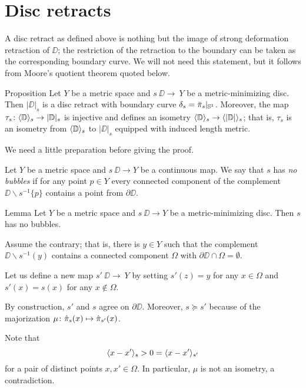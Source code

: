 \section{Disc retracts}\label{Metric-minimizing discs}

A disc retract as defined above is nothing but the image of strong deformation retraction of $\DD$;
the restriction of the retraction to the boundary can be taken as the corresponding boundary curve.
We will not need this statement, but it follows from Moore's quotient theorem quoted below. 

\begin{thm}{Proposition}\label{prop:|D|}
Let $Y$ be a metric space and $s\:\DD\to\ Y$ be a metric-minimizing disc.
Then $|\DD|_s$ is a disc retract with boundary curve $\delta_s=\bar\pi_s|_{\mathbb{S}^1}$.
Moreover, the map $\tau_s\colon\langle\mathbb{D}\rangle_s\to |\mathbb{D}|_s$ is injective and defines an isometry
$\<\DD\>_s\zz\to \<|\DD|\>_s$;
that is, $\tau_s$ is an isometry from $\langle\mathbb{D}\rangle_s$ to $|\DD|_s$ equipped with induced length metric.
\end{thm}

We need a little preparation before giving the proof.

Let $Y$ be a metric space and
$s\:\DD\to Y$ be a continuous map.
We say that $s$ has \label{page:no-bubble}\emph{no bubbles}
if for any point $p\in Y$ every connected component of the complement $\DD\backslash s^{-1}\{p\}$ contains a point from $\partial \DD$.

\begin{thm}{Lemma}\label{prop:point-complement}
Let $Y$ be a metric space and $s\:\DD\to Y$ be a metric-minimizing disc.
Then $s$ has no bubbles.
\end{thm}

Assume the contrary;
that is, there is $y\in Y$ such that the complement $\DD\backslash s^{-1}(y)$ contains a connected component $\Omega$ with $\partial \DD\cap \Omega=\emptyset$.

Let us define a new map $s'\:\DD\to\ Y$ by setting $s'(z)=y$ for any $x\in \Omega$ and $s'(x)=s(x)$ for any $x\notin \Omega$.

By construction, $s'$ and $s$ agree on $\partial\DD$. Moreover, $s\succcurlyeq s'$
because of the majorization $\mu\:\hat\pi_s(x)\zz\mapsto \hat\pi_{s'}(x)$.

Note that
\[\langle x-x'\rangle_{s}>0=\langle x-x'\rangle_{s'}\]
for a pair of distinct points $x,x'\in \Omega$.
In particular, $\mu$ is not an isometry, a contradiction.
\qeds



